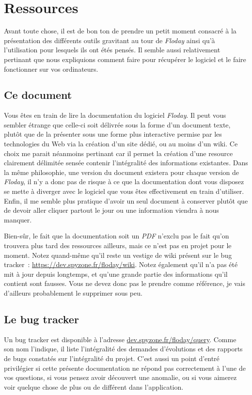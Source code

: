 \section{Ressources}
\begin{intro}
Avant toute chose, il est de bon ton de prendre un petit moment consacré à la présentation des différents outils gravitant au tour de \emph{Floday}  ainsi qu'à l'utilisation pour lesquels ils ont étés pensés.
Il semble aussi relativement pertinant que nous expliquions comment faire pour récupérer le logiciel et le faire fonctionner sur vos ordinateurs.
\end{intro}

\subsection{Ce document}
Vous êtes en train de lire la documentation du logiciel \emph{Floday}.
Il peut vous sembler étrange que celle-ci soit délivrée sous la forme d'un document texte, plutôt que de la présenter sous une forme plus interactive permise par les technologies du Web via la création d'un site dédié, ou au moins d'un wiki.
Ce choix me parait néanmoins pertinant car il permet la création d'une resource clairement délimitée sensée contenir l'intégralité des informations existantes.
Dans la même philosophie, une version du document existera pour chaque version de \emph{Floday}, il n'y a donc pas de risque à ce que la documentation dont vous disposez se mette à diverger avec le logiciel que vous êtes effectivement en train d'utiliser.
Enfin, il me semble plus pratique d'avoir un seul document à conserver plutôt que de devoir aller cliquer partout le jour ou une information viendra à nous manquer.

Bien-sûr, le fait que la documentation soit un \emph{PDF} n'exclu pas le fait qu'on trouvera plus tard des ressources ailleurs, mais ce n'est pas en projet pour le moment.
Notez quand-même qu'il reste un vestige de wiki présent sur le bug tracker~: \url{https://dev.spyzone.fr/floday/wiki}.
Notez également qu'il n'a pas été mit à jour depuis longtemps, et qu'une grande partie des informations qu'il contient sont fausses.
Vous ne devez donc pas le prendre comme référence, je vais d'ailleurs probablement le supprimer sous peu.

\subsection{Le bug tracker}
Un bug tracker est disponible à l'adresse \url{dev.spyzone.fr/floday/query}.
Comme son nom l'indique, il liste l'intégralité des demandes d'évolutions et des rapports de bugs constatés sur l'intégralité du projet.
C'est aussi un point d'entré privilégier si cette présente documentation ne répond pas correctement à l'une de vos questions, si vous pensez avoir découvert une anomalie, ou si vous aimerez voir quelque chose de plus ou de différent dans l'application.

